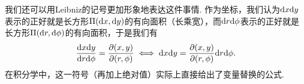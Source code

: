 \begin{example}[极坐标]
    我们还可以用Leibniz的记号更加形象地表达这件事情. 作为坐标，我们认为$\mathrm{d} x\mathrm{d} y$表示的正好就是长方形$\Pi(\mathrm{d} x,\mathrm{d} y)$的有向面积（长乘宽），而$\mathrm{d} r\mathrm{d}\phi$表示的正好就是长方形$\Pi(\mathrm{d} r,\mathrm{d} \phi)$的有向面积，于是我们有
    \[\frac{\mathrm{d} x\mathrm{d} y}{\mathrm{d} r\mathrm{d}\phi}=\frac{\partial(x,y)}{\partial(r,\phi)}\iff \mathrm{d} x \mathrm{d} y= \frac{\partial(x,y)}{\partial(r,\phi)}\mathrm{d} r\mathrm{d}\phi.\]
    在积分学中，这一符号（再加上绝对值）实际上直接给出了变量替换的公式.
\end{example}